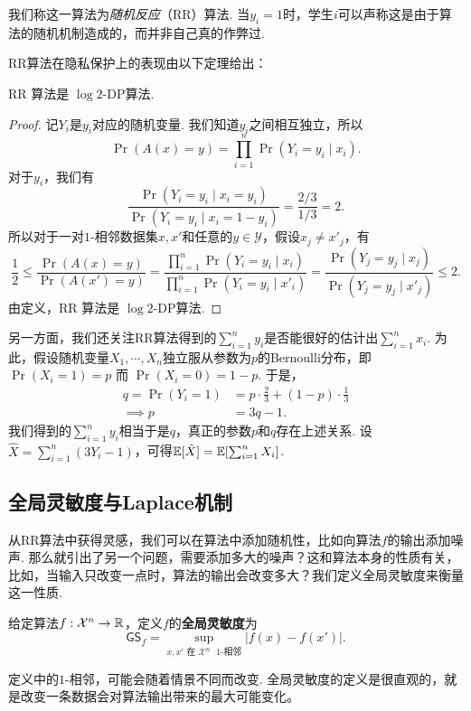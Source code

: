 我们称这一算法为\emph{随机反应}（RR）算法. 当$y_i = 1$时，学生$i$可以声称这是由于算法的随机机制造成的，而并非自己真的作弊过.

RR算法在隐私保护上的表现由以下定理给出：
\begin{theorem}
    RR 算法是 $\log 2$-DP算法.
\end{theorem}
\begin{proof}
记$Y_i$是$y_i$对应的随机变量. 我们知道$y_i$之间相互独立，所以
    \[
    \Pr(A(x) = y) = \prod_{i=1}^n \Pr(Y_i = y_i \mid x_i).
    \]
对于$y_i$，我们有
    \[
    \frac{\Pr(Y_i = y_i \mid x_i = y_i)}{\Pr(Y_i = y_i \mid x_i = 1 - y_i)} = \frac{2/3}{1/3} = 2.
    \]
所以对于一对$1$-相邻数据集$x, x'$和任意的$y \in \mathcal Y$，假设$x_j \neq x'_j$，有
    \[
    \frac12 \leq \frac{\Pr(A(x) = y)}{\Pr(A(x') = y)} = \frac{\prod_{i=1}^n \Pr(Y_i = y_i \mid x_i)}{\prod_{i=1}^n \Pr(Y_i = y_i \mid x'_i)} = \frac{\Pr(Y_j = y_j \mid x_j)}{\Pr(Y_j = y_j \mid x'_j)} \leq 2.
    \]
由定义，RR 算法是 $\log 2$-DP算法.
\end{proof}

另一方面，我们还关注RR算法得到的$\sum_{i=1}^n y_i$是否能很好的估计出$\sum_{i=1}^n x_i$. 为此，假设随机变量$X_1, \cdots, X_n$独立服从参数为$p$的Bernoulli分布，即 $\Pr(X_i=1) =p$ 而 $\Pr(X_i=0)= 1-p$. 于是，
\[\begin{aligned}
    q = \Pr(Y_i = 1) &= p \cdot \frac23 + (1 - p) \cdot \frac13 \\
    \implies p &= 3 q - 1.   
\end{aligned}\]
我们得到的$\sum_{i=1}^n y_i$相当于是$q$，真正的参数$p$和$q$存在上述关系. 设$\hat{X} = \sum_{i=1}^n (3 Y_i - 1)$，可得$\mathbb{E}[\hat{X}] = \mathbb{E}[\sum_{i=1}^n X_i]$.

\subsection{全局灵敏度与Laplace机制}
从RR算法中获得灵感，我们可以在算法中添加随机性，比如向算法$f$的输出添加噪声. 那么就引出了另一个问题，需要添加多大的噪声？这和算法本身的性质有关，比如，当输入只改变一点时，算法的输出会改变多大？我们定义全局灵敏度来衡量这一性质.

\begin{definition}[全局灵敏度]
给定算法$f: \mathcal X^n \to \mathbb{R}$，定义$f$的\textbf{全局灵敏度}为
    \[
    \mathsf{GS}_f = \sup_{x, x' \text{ 在 }\mathcal X^n\text{ $1$-相邻}} |f(x) - f(x')|. 
    \]
\end{definition}
定义中的$1$-相邻，可能会随着情景不同而改变. 全局灵敏度的定义是很直观的，就是改变一条数据会对算法输出带来的最大可能变化。

